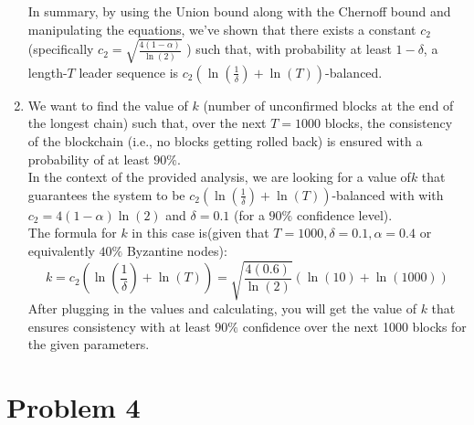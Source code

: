 \documentclass{article}
\begin{document}
\begin{enumerate}
In summary, by using the Union bound along with the Chernoff bound and manipulating the equations, we've shown that there exists a constant $c_2$ (specifically
$c_2 = \sqrt{ \frac{4(1-\alpha)}{\ln(2)}}$
) such that, with probability at least $1-\delta$, a length-$T$ leader sequence is $c_2 (\ln(\frac{1}{\delta}) + \ln(T))$-balanced.
\item We want to find the value of $k$ (number of unconfirmed blocks at the end of the longest chain) such that, over the next $T=1000$ blocks, the consistency of the blockchain (i.e., no blocks getting rolled back) is ensured with a probability of at least $90\%$.\\
In the context of the provided analysis, we are looking for a value of$k$ that guarantees the system to be $c_2 (\ln(\frac{1}{\delta}) + \ln(T))$-balanced with  with $c_2 = 4(1-\alpha) \ln(2) $ and $\delta=0.1$ (for a $90\%$ confidence level).
\\
The formula for $k$ in this case is(given that $T=1000, \delta = 0.1, \alpha = 0.4$ or equivalently $40\%$ Byzantine nodes):
\begin{equation}
    k = c_2 (\ln(\frac{1}{\delta}) + \ln(T)) = 
    \sqrt{\frac{4(0.6)}{\ln(2)}} (\ln(10) + \ln(1000))
\end{equation}
After plugging in the values and calculating, you will get the value of $k$ that ensures consistency with at least $90\%$ confidence over the next 1000 blocks for the given parameters.
\end{enumerate}
\section*{Problem 4}

\end{document}
